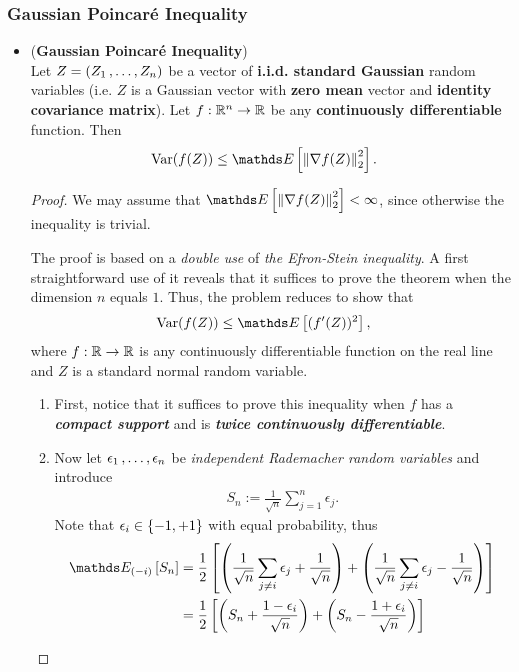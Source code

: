 \documentclass[11pt]{article}
\begin{document}
\subsubsection{Gaussian Poincar{\'e} Inequality}
\begin{itemize}
\item \begin{theorem} (\textbf{Gaussian Poincar{\'e} Inequality}) \citep{boucheron2013concentration} \\
Let $Z = (Z_1 \,{,}\ldots{,}\, Z_n)$ be a vector of \textbf{i.i.d. standard Gaussian} random variables (i.e. $Z$ is a Gaussian vector with \textbf{zero mean} vector and \textbf{identity covariance matrix}). Let $f : {\mathbb R}^n \to {\mathbb R}$ be any \textbf{continuously differentiable} function. Then
\begin{align}
\text{Var}(f(Z)) &\le \E{}{\norm{\nabla f(Z)}{2}^2}. \label{ineqn: gaussian_poincare_inequality}
\end{align}
\end{theorem}
\begin{proof}
We may assume that $\E{}{\norm{\nabla f(Z)}{2}^2} <\infty$, since otherwise the inequality is trivial. 

The proof is based on a \emph{double use} of \emph{the Efron-Stein inequality}.  A first straightforward use of it reveals that it suffices to prove the theorem when the dimension $n$ equals $1$. Thus, the problem reduces to show that
\begin{align}
\text{Var}(f(Z)) &\le \E{}{(f'(Z))^2}, \label{ineqn: gaussian_poincare_inequality_step1}
\end{align} where $f: {\mathbb R} \to {\mathbb R}$ is any continuously differentiable function on the real line and $Z$ is a standard normal random variable. 
\begin{enumerate}
\item First, notice that it suffices to prove this inequality when $f$ has a \emph{\textbf{compact support}} and is \emph{\textbf{twice continuously differentiable}}. 

\item Now let $\epsilon_1 \,{,}\ldots{,}\, \epsilon_n$ be \emph{independent Rademacher random variables} and introduce
\begin{align*}
S_n := \frac{1}{\sqrt{n}}\sum_{j=1}^{n}\epsilon_j.
\end{align*} 
Note that $\epsilon_i \in \left\{-1, +1\right\}$ with equal probability, thus
\begin{align*}
\E{(-i)}{S_n} &= \frac{1}{2}\brac{ \paren{\frac{1}{\sqrt{n}}\sum_{j \neq i}\epsilon_j + \frac{1}{\sqrt{n}}} + \paren{\frac{1}{\sqrt{n}}\sum_{j \neq i}\epsilon_j - \frac{1}{\sqrt{n}}}  } \\
&= \frac{1}{2}\brac{\paren{S_n + \frac{1 - \epsilon_i}{\sqrt{n}}} + \paren{S_n - \frac{1 + \epsilon_i}{\sqrt{n}}}}
\end{align*}


\end{enumerate}
\end{proof}
\end{itemize}
\end{document}
